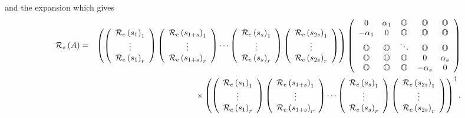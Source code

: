 and the expansion which gives 
\begin{eqnarray}
{\cal R}_{s}\left( A\right) &=&\left( \left( 
\begin{array}{c}
{\cal R}_{e}\left( s_{1}\right) _{1} \\ 
\vdots \\ 
{\cal R}_{e}\left( s_{1}\right) _{r}%
\end{array}%
\right) \left( 
\begin{array}{c}
{\cal R}_{e}\left( s_{1+s}\right) _{1} \\ 
\vdots \\ 
{\cal R}_{e}\left( s_{1+s}\right) _{r}%
\end{array}%
\right) \cdots \left( 
\begin{array}{c}
{\cal R}_{e}\left( s_{s}\right) _{1} \\ 
\vdots \\ 
{\cal R}_{e}\left( s_{s}\right) _{r}%
\end{array}%
\right) \left( 
\begin{array}{c}
{\cal R}_{e}\left( s_{2s}\right) _{1} \\ 
\vdots \\ 
{\cal R}_{e}\left( s_{2s}\right) _{r}%
\end{array}%
\right) \right) \left( 
\begin{array}{ccccc}
0 & \alpha _{1} & {\Bbb O} & {\Bbb O} & {\Bbb O} \\ 
-\alpha _{1} & 0 & {\Bbb O} & {\Bbb O} & {\Bbb O} \\ 
{\Bbb O} & {\Bbb O} & \ddots & {\Bbb O} & {\Bbb O} \\ 
{\Bbb O} & {\Bbb O} & {\Bbb O} & 0 & \alpha _{s} \\ 
{\Bbb O} & {\Bbb O} & {\Bbb O} & -\alpha _{s} & 0%
\end{array}%
\right) \\
&&\times \left( \left( 
\begin{array}{c}
{\cal R}_{e}\left( s_{1}\right) _{1} \\ 
\vdots \\ 
{\cal R}_{e}\left( s_{1}\right) _{r}%
\end{array}%
\right) \left( 
\begin{array}{c}
{\cal R}_{e}\left( s_{1+s}\right) _{1} \\ 
\vdots \\ 
{\cal R}_{e}\left( s_{1+s}\right) _{r}%
\end{array}%
\right) \cdots \left( 
\begin{array}{c}
{\cal R}_{e}\left( s_{s}\right) _{1} \\ 
\vdots \\ 
{\cal R}_{e}\left( s_{s}\right) _{r}%
\end{array}%
\right) \left( 
\begin{array}{c}
{\cal R}_{e}\left( s_{2s}\right) _{1} \\ 
\vdots \\ 
{\cal R}_{e}\left( s_{2s}\right) _{r}%
\end{array}%
\right) \right) ^{\dagger },
\end{eqnarray}

